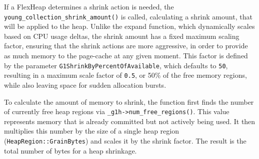 If a FlexHeap determines a shrink action is needed, the \texttt{young\_collection\_shrink\_amount()} is called, calculating a shrink amount,
that will be applied to the heap. Unlike the expand function, 
which dynamically scales based on CPU usage deltas, the shrink amount has a fixed maximum scaling factor, ensuring that the
shrink actions are more aggressive, in order to provide as much memory to the page-cache at any given moment. 
This factor is defined by the parameter \texttt{G1ShrinkByPercentOfAvailable}, 
which defaults to \texttt{50}, resulting in a maximum scale factor of \texttt{0.5}, or 50\% of the free memory regions,
while also leaving space for sudden allocation bursts.

To calculate the amount of memory to shrink, the function first finds the number of currently free heap 
regions via \texttt{\_g1h->num\_free\_regions()}. This value represents memory that is already committed but 
not actively being used. It then multiplies this number by the size of a single heap region (\texttt{HeapRegion::GrainBytes})
and scales it by the shrink factor. The result is the total number of bytes for a heap shrinkage.

